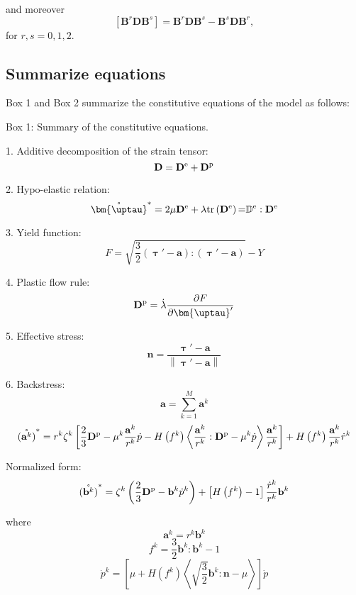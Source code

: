 and moreover
\begin{equation}
\left[ {{{\mathbf{B}}^r}{\mathbf{D}}{{\mathbf{B}}^s}} \right] = {{\mathbf{B}}^r}{\mathbf{D}}{{\mathbf{B}}^s} - {{\mathbf{B}}^s}{\mathbf{D}}{{\mathbf{B}}^r},
\end{equation}
for $r,s = 0,1,2$.

\subsection{Summarize equations}
\noindent
Box 1 and Box 2 summarize the constitutive equations of the model as follows:
\begin{framed}
\label{Box:1}
Box 1: Summary of the constitutive equations.

1. Additive decomposition of the strain tensor:
\[{\mathbf{D}} = {{\mathbf{D}}^{\rm{e}}} + {{\mathbf{D}}^{\rm{p}}}\]

2. Hypo-elastic relation:
\[{\mathring {\bm{\uptau }}^{*}} = 2\mu {{\mathbf{D}}^{\rm{e}}} + \lambda {\rm{tr}}\left( {{{\mathbf{D}}^{\rm{e}}}} \right){\rm{ = }}{\mathbb{D}^{\rm{e}}}:{{\mathbf{D}}^{\rm{e}}}\]

3. Yield function:
\[F = \sqrt {\frac{3}{2}\left( {{\bm{\uptau}}' - {\mathbf{a}}} \right):\left( {{\bm{\uptau}}' - {\mathbf{a}}} \right)}  - Y\]

4. Plastic flow rule:
\[{{{\mathbf{D}}^{\rm{p}}}} = \dot \lambda \frac{{\partial F}}{{\partial {\bm{\uptau }'}}}\]

5. Effective stress:
\[{\mathbf{n}} = \frac{{{\bm{\uptau}}' - {\mathbf{a}}}}{{\left\| {{\bm{\uptau}}' - {\mathbf{a}}} \right\|}}\]

6. Backstress:
\[{\mathbf{a}} = \sum\limits_{k = 1}^M {{{\mathbf{a}}^k}} \]
\[\mathring{\left({\mathbf{a}}^{k}\right)}^* = {r^k}{\zeta ^k}\left[ {\frac{2}{3}{{\mathbf{D}}^{\rm{p}}} - {\mu ^k}\frac{{{{\mathbf{a}}^k}}}{{{r^k}}}\dot p - H\left( {{f^k}} \right)\left\langle {\frac{{{{\mathbf{a}}^k}}}{{{r^k}}}:{{\mathbf{D}}^{\rm{p}}} - {\mu ^k}\dot p} \right\rangle \frac{{{{\mathbf{a}}^k}}}{{{r^k}}}} \right] + H\left( {{f^k}} \right)\frac{{{{\mathbf{a}}^k}}}{{{r^k}}}{\dot r^k}\]

Normalized form:
\[\mathring{\left({\mathbf{b}}^{k}\right)}^* = {\zeta ^k}\left( {\frac{2}{3}{{\mathbf{D}}^{\rm{p}}} - {{\mathbf{b}}^k}{{\dot p}^k}} \right) + \left[ {H\left( {{f^k}} \right) - 1} \right]\frac{{{{\dot r}^k}}}{{{r^k}}}{{\mathbf{b}}^k}\]

where
\[{{\mathbf{a}}^k} = {r^k}{{\mathbf{b}}^k}\]
\[{f^k} = \frac{3}{2}{{\mathbf{b}}^k}:{{\mathbf{b}}^k} - 1\]
\[{\dot p^k} = \left[ {\mu  + H\left( {{f^k}} \right)\left\langle {\sqrt {\frac{3}{2}} {{\mathbf{b}}^k}:{\mathbf{n}} - \mu } \right\rangle } \right]\dot p\]
\end{framed}


